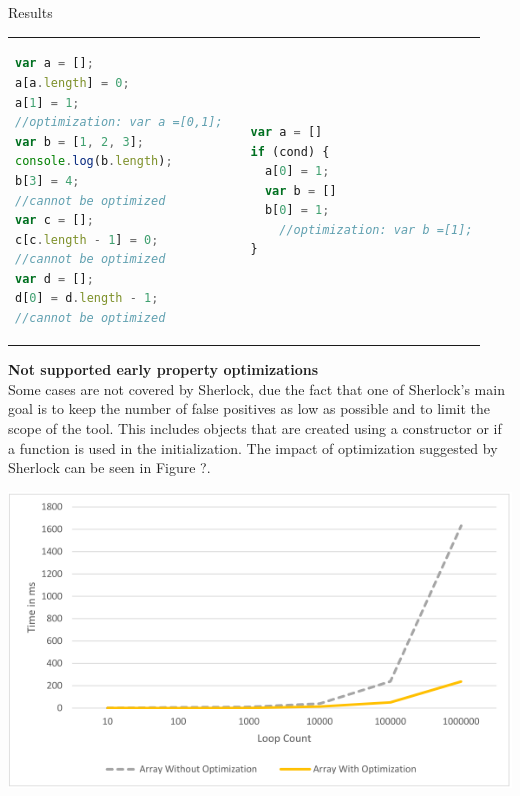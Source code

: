 \documentclass[a1paper,portrait,fontscale=0.418]{baposter}
\begin{document}
\begin{poster}
\begin{posterbox}[name=results1,span=2,column=1,row=0]{Results}
\begin{center}
\begin{tabular}{|l l |l }
\begin{lstlisting}[language=Javascript]
var a = [];
a[a.length] = 0;
a[1] = 1;
//optimization: var a =[0,1];
var b = [1, 2, 3];
console.log(b.length);
b[3] = 4;
//cannot be optimized
var c = [];
c[c.length - 1] = 0;
//cannot be optimized
var d = [];
d[0] = d.length - 1;
//cannot be optimized
\end{lstlisting}
& &
\begin{lstlisting}[language=Javascript]
var a = []
if (cond) {
  a[0] = 1;
  var b = []
  b[0] = 1;
	//optimization: var b =[1];
}
\end{lstlisting} 
\end{tabular}
\setlength{\tabcolsep}{12em}
\end{center}

\textbf{Not supported early property optimizations} \\ 
Some cases are not covered by Sherlock, due the fact that one of Sherlock's main goal is to keep the number of false positives as low as possible and to limit the scope of the tool. This includes objects that are created using a constructor or if a function is used in the initialization. The impact of optimization suggested by Sherlock can be seen in Figure ?.


 
\begin{center}
\includegraphics[width=0.7\linewidth]{impact.png}
\end{center}


\end{posterbox}



\end{poster}
\end{document}
